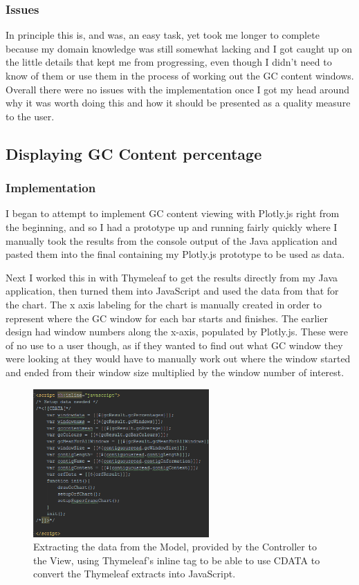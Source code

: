 \subsubsection{Issues}
In principle this is, and was, an easy task, yet took me longer to complete because my domain knowledge was still somewhat lacking and I got caught up on the little details that kept me from progressing, even though I didn't need to know of them or use them in the process of working out the GC content windows. Overall there were no issues with the implementation once I got my head around why it was worth doing this and how it should be presented as a quality measure to the user.

\subsection{Displaying GC Content percentage}
\subsubsection{Implementation}
I began to attempt to implement GC content viewing with Plotly.js right from the beginning, and so I had a prototype up and running fairly quickly where I manually took the results from the console output of the Java application and pasted them into the final containing my Plotly.js prototype to be used as data. 

Next I worked this in with Thymeleaf to get the results directly from my Java application, then turned them into JavaScript and used the data from that for the chart. The x axis labeling for the chart is manually created in order to represent where the GC window for each bar starts and finishes. The earlier design had window numbers along the x-axis, populated by Plotly.js. These were of no use to a user though, as if they wanted to find out what GC window they were looking at they would have to manually work out where the window started and ended from their window size multiplied by the window number of interest.

\begin{figure}[H]
\centering
\includegraphics[width=0.6\textwidth]{images/thymeleafdata}
\caption{Extracting the data from the Model, provided by the Controller to the View, using Thymeleaf's inline tag to be able to use CDATA to convert the Thymeleaf extracts into JavaScript.}
\end{figure}

